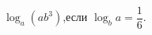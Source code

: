 \begin{ex}[type=calculate_expression]
	\begin{condition}
		\( \log_a (ab^3) \),\quad если \( \log_b a = \dfrac{1}{6} \).
	\end{condition}
\end{ex}